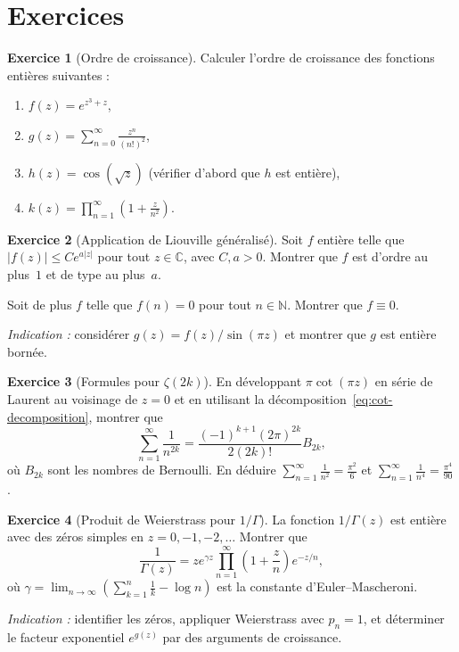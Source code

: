 \documentclass[12pt,a4paper,openany]{book}
\theoremstyle{definition}
\newtheorem{exercice}{Exercice}[chapter]
\theoremstyle{plain}
\theoremstyle{remark}
\newcommand{\C}{\mathbb{C}}
\newcommand{\N}{\mathbb{N}}
\newcommand{\abs}[1]{\left|#1\right|}
\begin{document}
\section{Exercices}\label{sec:exercices-ch10}

\begin{exercice}[Ordre de croissance]\label{exo:ordre-croissance}
Calculer l'ordre de croissance des fonctions entières suivantes :
\begin{enumerate}[label=(\alph*)]
  \item $f(z) = e^{z^3 + z}$,
  \item $g(z) = \sum_{n=0}^{\infty} \frac{z^n}{(n!)^2}$,
  \item $h(z) = \cos(\sqrt{z})$ (vérifier d'abord que $h$ est entière),
  \item $k(z) = \prod_{n=1}^{\infty} \left(1 + \frac{z}{n^2}\right)$.
\end{enumerate}
\end{exercice}

\begin{exercice}[Application de Liouville généralisé]\label{exo:liouville-gen}
Soit $f$ entière telle que $\abs{f(z)} \leq C e^{a\abs{z}}$ pour tout $z \in \C$,
avec $C, a > 0$. Montrer que $f$ est d'ordre au plus~$1$ et de type au plus~$a$.

Soit de plus $f$ telle que $f(n) = 0$ pour tout $n \in \N$. Montrer que
$f \equiv 0$.

\textit{Indication :} considérer $g(z) = f(z)/\sin(\pi z)$ et montrer que
$g$ est entière bornée.
\end{exercice}

\begin{exercice}[Formules pour $\zeta(2k)$]\label{exo:zeta-pairs}
En développant $\pi\cot(\pi z)$ en série de Laurent au voisinage de $z = 0$
et en utilisant la décomposition~\eqref{eq:cot-decomposition}, montrer que
\[
  \sum_{n=1}^{\infty} \frac{1}{n^{2k}} = \frac{(-1)^{k+1}(2\pi)^{2k}}{2(2k)!} B_{2k},
\]
où $B_{2k}$ sont les nombres de Bernoulli. En déduire
$\sum_{n=1}^{\infty} \frac{1}{n^2} = \frac{\pi^2}{6}$ et
$\sum_{n=1}^{\infty} \frac{1}{n^4} = \frac{\pi^4}{90}$.
\end{exercice}

\begin{exercice}[Produit de Weierstrass pour $1/\Gamma$]\label{exo:weierstrass-gamma}
La fonction $1/\Gamma(z)$ est entière avec des zéros simples en
$z = 0, -1, -2, \ldots$ Montrer que
\[
  \frac{1}{\Gamma(z)} = z e^{\gamma z} \prod_{n=1}^{\infty}
  \left(1 + \frac{z}{n}\right) e^{-z/n},
\]
où $\gamma = \lim_{n\to\infty}\left(\sum_{k=1}^n \frac{1}{k} - \log n\right)$
est la constante d'Euler--Mascheroni.

\textit{Indication :} identifier les zéros, appliquer Weierstrass avec $p_n = 1$,
et déterminer le facteur exponentiel $e^{g(z)}$ par des arguments de croissance.
\end{exercice}
\end{document}
